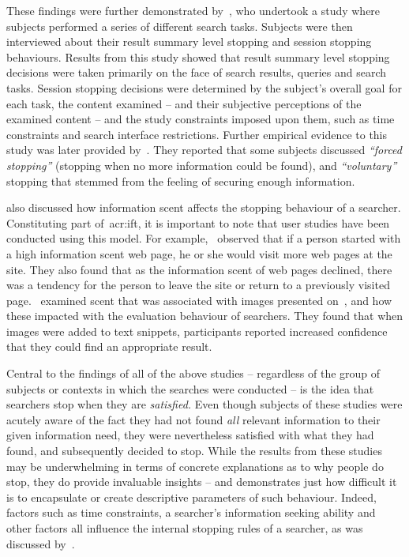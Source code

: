 These findings were further demonstrated by~\cite{wu2014information_scent}, who undertook a study where subjects performed a series of different search tasks. Subjects were then interviewed about their result summary level stopping and session stopping behaviours. Results from this study showed that result summary level stopping decisions were taken primarily on the face of search results, queries and search tasks. Session stopping decisions were determined by the subject's overall goal for each task, the content examined -- and their subjective perceptions of the examined content -- and the study constraints imposed upon them, such as time constraints and search interface restrictions. Further empirical evidence to this study was later provided by~\cite{wu2014stopping_query_abandonment}. They reported that some subjects discussed \emph{``forced stopping''} (stopping when no more information could be found), and \emph{``voluntary''} stopping that stemmed from the feeling of securing enough information.

\cite{wu2014information_scent} also discussed how information scent affects the stopping behaviour of a searcher. Constituting part of~\gls{acr:ift}, it is important to note that user studies have been conducted using this model. For example,~\cite{card2001scent_graphs} observed that if a person started with a high information scent web page, he or she would visit more web pages at the site. They also found that as the information scent of web pages declined, there was a tendency for the person to leave the site or return to a previously visited page.~\cite{loumakis2011image_smells} examined scent that was associated with images presented on~, and how these impacted with the evaluation behaviour of searchers. They found that when images were added to text snippets, participants reported increased confidence that they could find an appropriate result.

Central to the findings of all of the above studies -- regardless of the group of subjects or contexts in which the searches were conducted -- is the idea that searchers stop when they are \emph{satisfied.} Even though subjects of these studies were acutely aware of the fact they had not found \emph{all} relevant information to their given information need, they were nevertheless satisfied with what they had found, and subsequently decided to stop. While the results from these studies may be underwhelming in terms of concrete explanations as to why people do stop, they do provide invaluable insights -- and demonstrates just how difficult it is to encapsulate or create descriptive parameters of such behaviour. Indeed, factors such as time constraints, a searcher's information seeking ability and other factors all influence the internal stopping rules of a searcher, as was discussed by~\cite{marchionini1995information_seeking}. 

